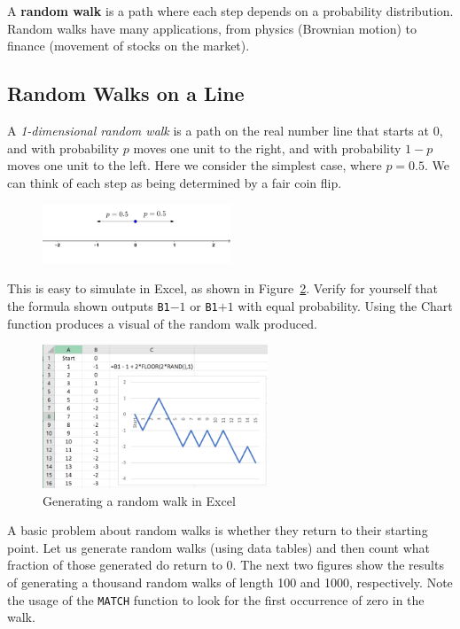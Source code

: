 A \textbf{random walk} is a path where each step depends on a probability distribution.
Random walks have many applications, from physics (Brownian motion) to finance (movement of stocks on the market).

\subsection{Random Walks on a Line} 
A \emph{1-dimensional random walk} is a path on the real number line that starts at $0$, and with probability $p$ moves one unit to the right, and with probability $1-p$ moves one unit to the left.
Here we consider the simplest case, where $p = 0.5$.
We can think of each step as being determined by a fair coin flip.

\begin{figure}[htbp]
	\centering
	\includegraphics[width=0.5\textwidth]{fig/3_randomwalk_1.png}
	\label{fig:3_randomwalk_1}
\end{figure}

\vspace{-0.3cm}

This is easy to simulate in Excel, as shown in Figure~\ref{fig:3_randomwalk_2}.
Verify for yourself that the formula shown outputs \texttt{B1}$-1$ or \texttt{B1}$+1$ with equal probability.
Using the Chart function produces a visual of the random walk produced.

\begin{figure}[htbp]
	\centering
	\includegraphics[width=0.6\textwidth]{fig/3_randomwalk_2.png}
	\caption{Generating a random walk in Excel \label{fig:3_randomwalk_2}}
\end{figure}

A basic problem about random walks is whether they return to their starting point.
Let us generate random walks (using data tables) and then count what fraction of those generated do return to 0.
The next two figures show the results of generating a thousand random walks of length 100 and 1000, respectively.
Note the usage of the \texttt{MATCH} function to look for the first occurrence of zero in the walk.

